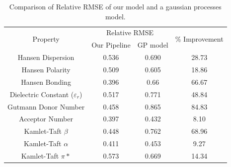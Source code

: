 \documentclass[
  english,        %
  font=times,     %
  onecolumn,      %
]{article}
\begin{document}
\begin{table}[h!]

\centering
\begin{tabular}{cccc}
\toprule
\multirow{2}{*}{Property}        & \multicolumn{2}{c}{Relative RMSE} & \multirow{2}{*}{\% Improvement} \\
                                 & Our Pipeline   & GP model  &                               \\
                                 \midrule
Hansen Dispersion                & 0.536          & 0.690            & 28.73                              \\

Hansen Polarity                  & 0.509          & 0.605            & 18.86                             \\

Hansen Bonding                   & 0.396          & 0.66            & 66.67                              \\

Dielectric Constant ($\varepsilon_r$) & 0.517          & 0.771            & 48.84                              \\

Gutmann Donor Number                     & 0.458          & 0.865            & 84.83                              \\
Acceptor Number                 & 0.397         & 0.432           & 8.10                             \\
Kamlet-Taft $\beta$              & 0.448          & 0.762            & 68.96                              \\

Kamlet-Taft $\alpha$                     & 0.411               & 0.453          & 9.27                             \\
Kamlet-Taft $\pi*$                  & 0.573         & 0.669            & 14.34                           \\
\bottomrule
\end{tabular}
\caption{Comparison of Relative RMSE of our model and a gaussian processes model. }\label{tab:compariosn_models}
\end{table}




\end{document}
